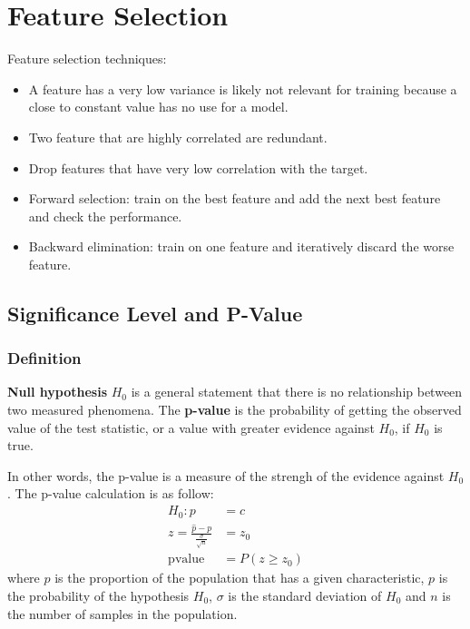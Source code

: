 \documentclass[12pt]{report}
\begin{document}
    \section{Feature Selection}
        Feature selection techniques:
        \begin{itemize}
            \item A feature has a very low variance is likely not relevant for training because a close to constant value has no use for a model.
            \item Two feature that are highly correlated are redundant.
            \item Drop features that have very low correlation with the target.
            \item Forward selection: train on the best feature and add the next best feature and check the performance.
            \item Backward elimination: train on one feature and iteratively discard the worse feature.
        \end{itemize}
    
        \subsection{Significance Level and P-Value}
            \subsubsection{Definition}
                \textbf{Null hypothesis} $H_0$ is a general statement that there is no relationship between two measured phenomena. The \textbf{p-value} is the probability of getting the observed value of the test statistic, or a value with greater evidence against $H_0$, if $H_0$ is true.
                
                In other words, the p-value is a measure of the strengh of the evidence against $H_0$. The p-value calculation is as follow:
                \begin{align}
                    H_0 : p &= c\\
                    z = \frac{\hat{p} - p}{\frac{\sigma}{\sqrt{n}}} &= z_0 \\
                    \text{pvalue} &= P(z \geq z_0)
                \end{align}
                where $\hat{p}$ is the proportion of the population that has a given characteristic, $p$ is the probability of the hypothesis $H_0$, $\sigma$ is the standard deviation of $H_0$ and $n$ is the number of samples in the population.
            
\end{document}
